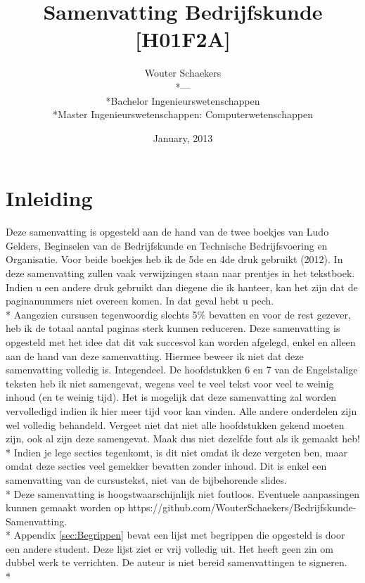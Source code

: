 \documentclass[12pt]{article}
\title{Samenvatting Bedrijfskunde [H01F2A]}
\author{Wouter Schaekers\\*---\\*Bachelor Ingenieurswetenschappen\\*Master Ingenieurswetenschappen: Computerwetenschappen}
\date{January, 2013}
\begin{document}
\pagestyle{fancy}
\maketitle
\setcounter{page}{0}
\setcounter{section}{-1}
\renewcommand{\contentsname}{Inhoudstafel}
\setcounter{tocdepth}{3}
\tableofcontents
\clearpage
\section{Inleiding}
Deze samenvatting is opgesteld aan de hand van de twee boekjes van Ludo Gelders, Beginselen van de Bedrijfskunde en Technische Bedrijfsvoering en Organisatie. Voor beide boekjes heb ik de 5de en 4de druk gebruikt (2012). In deze samenvatting zullen vaak verwijzingen staan naar prentjes in het tekstboek. Indien u een andere druk gebruikt dan diegene die ik hanteer, kan het zijn dat de paginanummers niet overeen komen. In dat geval hebt u pech.\\*
Aangezien cursusen tegenwoordig slechts 5\% bevatten en voor de rest gezever, heb ik de totaal aantal paginas sterk kunnen reduceren. Deze samenvatting is opgesteld met het idee dat dit vak succesvol kan worden afgelegd, enkel en alleen aan de hand van deze samenvatting. Hiermee beweer ik niet dat deze samenvatting volledig is. Integendeel. De hoofdstukken 6 en 7 van de Engelstalige teksten heb ik niet samengevat, wegens veel te veel tekst voor veel te weinig inhoud (en te weinig tijd). Het is mogelijk dat deze samenvatting zal worden vervolledigd indien ik hier meer tijd voor kan vinden. Alle andere onderdelen zijn wel volledig behandeld. Vergeet niet dat niet alle hoofdstukken gekend moeten zijn, ook al zijn deze samengevat. Maak dus niet dezelfde fout als ik gemaakt heb!\\*
Indien je lege secties tegenkomt, is dit niet omdat ik deze vergeten ben, maar omdat deze secties veel gemekker bevatten zonder inhoud.
Dit is enkel een samenvatting van de cursustekst, niet van de bijbehorende slides.\\*
Deze samenvatting is hoogstwaarschijnlijk niet foutloos. Eventuele aanpassingen kunnen gemaakt worden op https://github.com/WouterSchaekers/Bedrijfskunde-Samenvatting.\\*
Appendix \ref{sec:Begrippen} bevat een lijst met begrippen die opgesteld is door een andere student. Deze lijst ziet er vrij volledig uit. Het heeft geen zin om dubbel werk te verrichten.
\clearpage
\noindent De auteur is niet bereid samenvattingen te signeren.\\*
\end{document}
